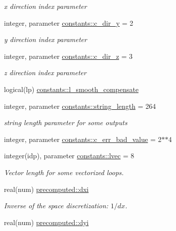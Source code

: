 \begin{DoxyCompactItemize}
\begin{DoxyCompactList}\small\item\em x direction index parameter \end{DoxyCompactList}\item 
integer, parameter \hyperlink{namespaceconstants_a5d84bc6ed2e3bd7b6e64704dc587825b}{constants\+::c\+\_\+dir\+\_\+y} = 2
\begin{DoxyCompactList}\small\item\em y direction index parameter \end{DoxyCompactList}\item 
integer, parameter \hyperlink{namespaceconstants_a9d2fa70332164d956c148a895e769983}{constants\+::c\+\_\+dir\+\_\+z} = 3
\begin{DoxyCompactList}\small\item\em z direction index parameter \end{DoxyCompactList}\item 
logical(lp) \hyperlink{namespaceconstants_a1a543c29c1b8e1fee70164d6704fbbb5}{constants\+::l\+\_\+smooth\+\_\+compensate}
\item 
integer, parameter \hyperlink{namespaceconstants_a6082bfa433cfb27d3f80d0f32b278570}{constants\+::string\+\_\+length} = 264
\begin{DoxyCompactList}\small\item\em string length parameter for some outputs \end{DoxyCompactList}\item 
integer, parameter \hyperlink{namespaceconstants_a0c96dab545557ad23bf55d7576f5405f}{constants\+::c\+\_\+err\+\_\+bad\+\_\+value} = 2$\ast$$\ast$4
\item 
integer(idp), parameter \hyperlink{namespaceconstants_a68354913203e3e01c9b0b547e9d95aae}{constants\+::lvec} = 8
\begin{DoxyCompactList}\small\item\em Vector length for some vectorized loops. \end{DoxyCompactList}\item 
real(num) \hyperlink{namespaceprecomputed_a3277a11e038b89b7572ad654aa6ebdf9}{precomputed\+::dxi}
\begin{DoxyCompactList}\small\item\em Inverse of the space discretization\+: $ 1/dx $. \end{DoxyCompactList}\item 
real(num) \hyperlink{namespaceprecomputed_aba4c7d47df04f7bff362b159a9507bd0}{precomputed\+::dyi}
$$
\end{DoxyCompactItemize}

